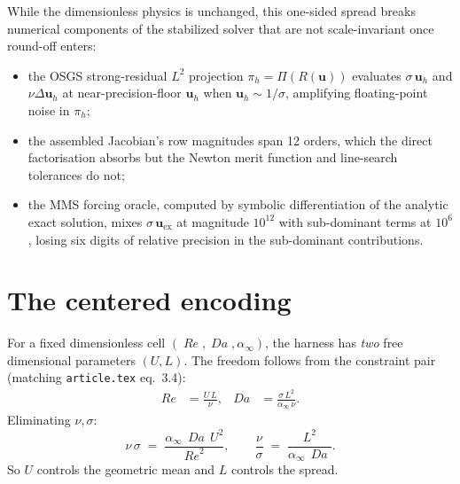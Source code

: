 \documentclass[11pt]{article}
\newcommand{\Reyn}{\operatorname{\mathit{Re}}}
\newcommand{\Damk}{\operatorname{\mathit{Da}}}
\begin{document}
While the dimensionless physics is unchanged, this one-sided spread breaks
numerical components of the stabilized solver that are not scale-invariant
once round-off enters:
\begin{itemize}
  \item the OSGS strong-residual $L^2$ projection
        $\pi_h = \Pi(R(\boldsymbol{u}))$ evaluates
        $\sigma\,\boldsymbol{u}_h$ and $\nu \Delta \boldsymbol{u}_h$ at
        near-precision-floor $\boldsymbol{u}_h$ when
        $\boldsymbol{u}_h \sim 1/\sigma$, amplifying floating-point noise
        in $\pi_h$;
  \item the assembled Jacobian's row magnitudes span 12 orders, which the
        direct factorisation absorbs but the Newton merit function and
        line-search tolerances do not;
  \item the MMS forcing oracle, computed by symbolic differentiation of the
        analytic exact solution, mixes $\sigma\,\boldsymbol{u}_{\mathrm{ex}}$
        at magnitude $10^{12}$ with sub-dominant terms at $10^{6}$, losing
        six digits of relative precision in the sub-dominant contributions.
\end{itemize}

\section{The centered encoding}

For a fixed dimensionless cell $(\Reyn, \Damk, \alpha_\infty)$, the
harness has \emph{two} free dimensional parameters $(U, L)$. The freedom
follows from the constraint pair (matching \texttt{article.tex} eq.~3.4):
\begin{align}
  \Reyn  &= \frac{U\,L}{\nu}, &
  \Damk  &= \frac{\sigma\,L^2}{\alpha_\infty\,\nu}.
\end{align}
Eliminating $\nu, \sigma$:
\begin{equation}
  \nu\,\sigma
   \;=\; \frac{\alpha_\infty\,\Damk\,U^{2}}{\Reyn^{2}},
  \qquad
  \frac{\nu}{\sigma}
   \;=\; \frac{L^{2}}{\alpha_\infty\,\Damk}.
\end{equation}
So $U$ controls the geometric mean and $L$ controls the spread.
\end{document}
